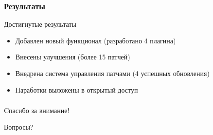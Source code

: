 \documentclass[unicode]{beamer}
\begin{document}
\begin{frame}
\transwipe[direction=90]
\frametitle{Результаты}
\begin{block}{Достигнутые результаты}
\begin{itemize}
  \item Добавлен новый функционал  (разработано 4 плагина)
  \item Внесены улучшения (более 15 патчей)
  \item Внедрена система управления патчами (4 успешных обновления)
  \item Наработки выложены в открытый доступ
\end{itemize}
\end{block}
\end{frame}

\begin{frame}
\transwipe[direction=90]
\frametitle{}
\centerline{\large{Cпасибо за внимание!}}
\hspace{2cm}
\centerline{\huge{Вопросы?}}
\end{frame}
\end{document}

